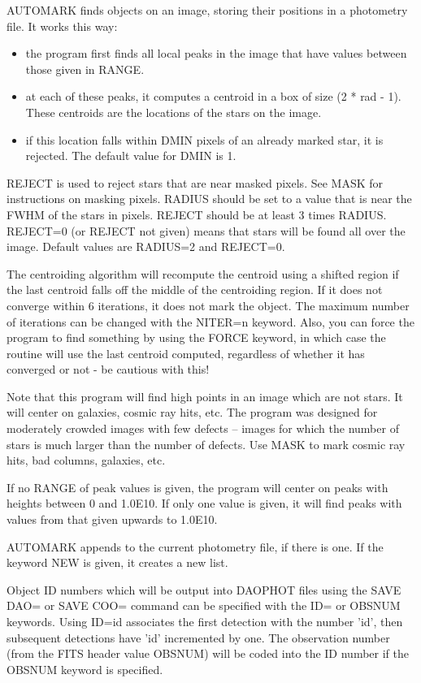 AUTOMARK finds objects on an image, storing their positions in a photometry
file.  It works this way: 
\begin{itemize}
  \item{the program first finds all local peaks in the image
   that have values between those given in RANGE.  }
  \item{at each of these peaks, it computes a centroid in a box
   of size (2 * rad - 1).  These centroids are the locations
   of the stars on the image.}
  \item{if this location falls within DMIN pixels of an already
           marked star, it is rejected. The default value for DMIN is 1.}
\end{itemize}
REJECT is used to reject stars that are near masked pixels.  See MASK for
instructions on masking pixels. RADIUS should be set to a value that is
near the FWHM of the stars in pixels.  REJECT should be at least 3 times
RADIUS.  REJECT=0 (or REJECT not given) means that stars will be found all
over the image.  Default values are RADIUS=2 and REJECT=0.

The centroiding algorithm will recompute the centroid using a shifted
region if the last centroid falls off the middle of the centroiding
region. If it does not converge within 6 iterations, it does not mark the
object. The maximum number of iterations can be changed with the NITER=n
keyword. Also, you can force the program to find something by using the
FORCE keyword, in which case the routine will use the last centroid
computed, regardless of whether it has converged or not - be cautious with
this!

Note that this program will find high points in an image which are not
stars.  It will center on galaxies, cosmic ray hits, etc.  The program was
designed for moderately crowded images with few defects -- images for which
the number of stars is much larger than the number of defects.  Use MASK to
mark cosmic ray hits, bad columns, galaxies, etc.

If no RANGE of peak values is given, the program will center on peaks with
heights between 0 and 1.0E10.  If only one value is given, it will find
peaks with values from that given upwards to 1.0E10.

AUTOMARK appends to the current photometry file, if there is one.  If the
keyword NEW is given, it creates a new list.

Object ID numbers which will be output into DAOPHOT files using the SAVE
DAO= or SAVE COO= command can be specified with the ID= or OBSNUM
keywords. Using ID=id associates the first detection with the number 'id',
then subsequent detections have 'id' incremented by one.  The observation
number (from the FITS header value OBSNUM) will be coded into the ID number
if the OBSNUM keyword is specified.

